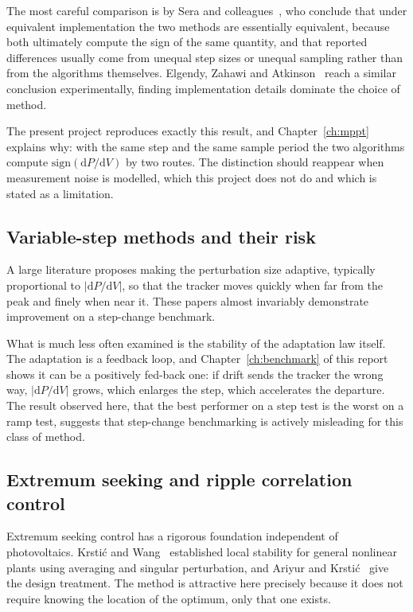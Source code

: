 The most careful comparison is by Sera and colleagues~\cite{sera}, who conclude
that under equivalent implementation the two methods are essentially equivalent,
because both ultimately compute the sign of the same quantity, and that reported
differences usually come from unequal step sizes or unequal sampling rather than
from the algorithms themselves. Elgendy, Zahawi and Atkinson~\cite{elgendy}
reach a similar conclusion experimentally, finding implementation details
dominate the choice of method.

The present project reproduces exactly this result, and Chapter~\ref{ch:mppt}
explains why: with the same step and the same sample period the two algorithms
compute $\mathrm{sign}(\mathrm{d}P/\mathrm{d}V)$ by two routes. The distinction
should reappear when measurement noise is modelled, which this project does not
do and which is stated as a limitation.

\subsection{Variable-step methods and their risk}

A large literature proposes making the perturbation size adaptive, typically
proportional to $|\mathrm{d}P/\mathrm{d}V|$, so that the tracker moves quickly
when far from the peak and finely when near it. These papers almost invariably
demonstrate improvement on a step-change benchmark.

What is much less often examined is the stability of the adaptation law itself.
The adaptation is a feedback loop, and Chapter~\ref{ch:benchmark} of this report
shows it can be a positively fed-back one: if drift sends the tracker the wrong
way, $|\mathrm{d}P/\mathrm{d}V|$ grows, which enlarges the step, which
accelerates the departure. The result observed here, that the best performer on
a step test is the worst on a ramp test, suggests that step-change benchmarking
is actively misleading for this class of method.

\subsection{Extremum seeking and ripple correlation control}

Extremum seeking control has a rigorous foundation independent of photovoltaics.
Krsti\'{c} and Wang~\cite{krstic} established local stability for general
nonlinear plants using averaging and singular perturbation, and Ariyur and
Krsti\'{c}~\cite{ariyur} give the design treatment. The method is attractive
here precisely because it does not require knowing the location of the optimum,
only that one exists.

